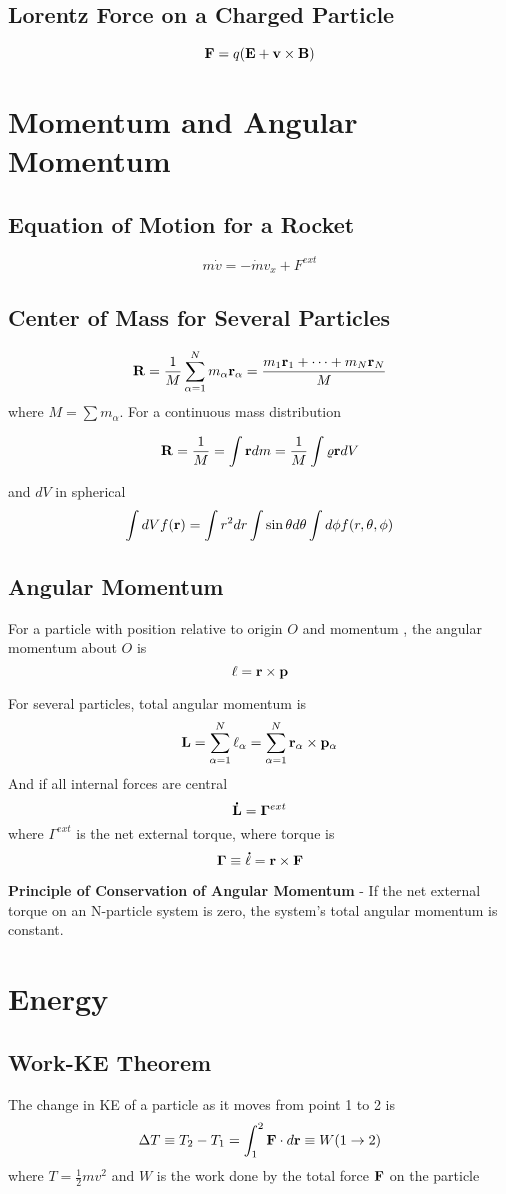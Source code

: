 \documentclass{article}
\begin{document}
\subsection*{Lorentz Force on a Charged Particle}
$$
\vb{F} = q(\vb{E} + \vb{v} \times \vb{B})
$$

\section{Momentum and Angular Momentum}
\subsection*{Equation of Motion for a Rocket}
$$
m\dot{v} = -\dot{m}v_{x} + F^{ext}
$$
\subsection*{Center of Mass for Several Particles}
$$
\vb{R} = \frac{1}{M}\sum_{\alpha=1}^{N} m_{\alpha}\vb{r}_{\alpha} = \frac{m_1 \vb{r}_1 + \dots + m_N \vb{r}_N}{M}
$$
where $M = \sum m_{\alpha}$. For a continuous mass distribution

$$
\vb{R} = \frac{1}{M} = \int \vb{r} dm = \frac{1}{M} \int \varrho \vb{r} dV
$$

and $dV$ in spherical 
$$
\int dV f(\vb{r}) = \int r^2 dr \int \sin\theta d\theta \int d\phi f(r,\theta,\phi)
$$
\subsection*{Angular Momentum}
For a particle with position  relative to origin $O$ and momentum , the angular momentum about $O$ is
$$ \vb{\ell} = \vb{r} \times \vb{p} $$

For several particles, total angular momentum is
$$
\vb{L} = \sum_{\alpha=1}^{N} \vb{\ell}_{\alpha} = \sum_{\alpha=1}^{N} \vb{r}_{\alpha} \times \vb{p}_{\alpha}
$$
And if all internal forces are central
$$\vb{\dot{L}} = \vb{\Gamma}^{ext}$$
where $\Gamma^{ext}$ is the net external torque, where torque is
$$
\vb{\Gamma} \equiv \vb{\dot{\ell}} = \vb{r} \times \vb{F}
$$

\textbf{Principle of Conservation of Angular Momentum} - If the net external torque on an N-particle system is zero, the system's total angular momentum is constant.

\section{Energy}
\subsection*{Work-KE Theorem}
The change in KE of a particle as it moves from point 1 to 2 is
$$
\Delta T \equiv T_{2} - T_{1} = \int_{1}^{2} \vb{F} \cdot d\vb{r} \equiv W(1 \to 2)
$$
where $T = \frac{1}{2}mv^2$ and $W$ is the work done by the total force $\vb{F}$ on the particle
\end{document}
